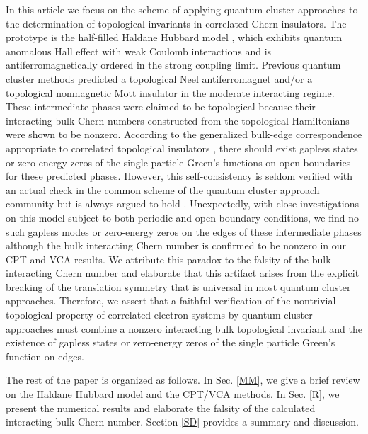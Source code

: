 \documentclass[12pt]{iopart}
\begin{document}
\par In this article we focus on the scheme of applying quantum cluster approaches to the determination of topological invariants in correlated Chern insulators. The prototype is the half-filled Haldane Hubbard model \cite{HZKL_PRB2011-1,HZKL_PRB2011-2,MR_PRB2013,HRP_PRB2015,ZSWZ_PRB2015,HCPP_PRL2016,VSLTHT_PRL2016,IWT_PRB2016,ASHP_PRB2016,GJMP_PRB2016,GR_NJP2018,LTTNNH_PBCM2018}, which exhibits quantum anomalous Hall effect with weak Coulomb interactions and is antiferromagnetically ordered in the strong coupling limit. Previous quantum cluster methods \cite{WFSM_PRB2016} predicted a topological Neel antiferromagnet and/or a topological nonmagnetic Mott insulator in the moderate interacting regime. These intermediate phases were claimed to be topological because their interacting bulk Chern numbers constructed from the topological Hamiltonians were shown to be nonzero. According to the generalized bulk-edge correspondence appropriate to correlated topological insulators \cite{G_PRB2011,EG_PRB2011}, there should exist gapless states or zero-energy zeros of the single particle Green's functions on open boundaries for these predicted phases. However, this self-consistency is seldom verified with an actual check in the common scheme of the quantum cluster approach community but is always argued to hold \cite{WFSM_PRB2016}. Unexpectedly, with close investigations on this model subject to both periodic and open boundary conditions, we find no such gapless modes or zero-energy zeros on the edges of these intermediate phases although the bulk interacting Chern number is confirmed to be nonzero in our CPT and VCA results. We attribute this paradox to the falsity of the bulk interacting Chern number and elaborate that this artifact arises from the explicit breaking of the translation symmetry that is universal in most quantum cluster approaches. Therefore, we assert that a faithful verification of the nontrivial topological property of correlated electron systems by quantum cluster approaches must combine a nonzero interacting bulk topological invariant and the existence of gapless states or zero-energy zeros of the single particle Green's function on edges.

\par The rest of the paper is organized as follows. In Sec. \ref{MM}, we give a brief review on the Haldane Hubbard model and the CPT/VCA methods. In Sec. \ref{R}, we present the numerical results and elaborate the falsity of the calculated interacting bulk Chern number. Section \ref{SD} provides a summary and discussion.
\end{document}

